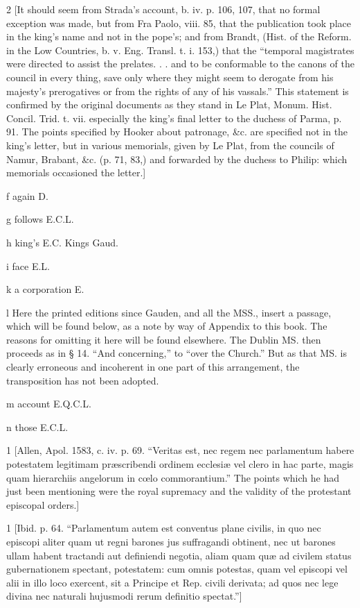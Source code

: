 2
[It should seem from Strada’s account, b. iv. p. 106, 107, that no formal exception was made, but from Fra Paolo, viii. 85, that the publication took place in the king’s name and not in the pope’s; and from Brandt, (Hist. of the Reform. in the Low Countries, b. v. Eng. Transl. t. i. 153,) that the “temporal magistrates were directed to assist the prelates. . . and to be conformable to the canons of the council in every thing, save only where they might seem to derogate from his majesty’s prerogatives or from the rights of any of his vassals.” This statement is confirmed by the original documents as they stand in Le Plat, Monum. Hist. Concil. Trid. t. vii. especially the king’s final letter to the duchess of Parma, p. 91. The points specified by Hooker about patronage, &c. are specified not in the king’s letter, but in various memorials, given by Le Plat, from the councils of Namur, Brabant, &c. (p. 71, 83,) and forwarded by the duchess to Philip: which memorials occasioned the letter.]

f
again D.

g
follows E.C.L.

h
king’s E.C. Kings Gaud.

i
face E.L.

k
a corporation E.

l
Here the printed editions since Gauden, and all the MSS., insert a passage, which will be found below, as a note by way of Appendix to this book. The reasons for omitting it here will be found elsewhere. The Dublin MS. then proceeds as in § 14. “And concerning,” to “over the Church.” But as that MS. is clearly erroneous and incoherent in one part of this arrangement, the transposition has not been adopted.

m
account E.Q.C.L.

n
those E.C.L.

1
[Allen, Apol. 1583, c. iv. p. 69. “Veritas est, nec regem nec parlamentum habere potestatem legitimam præscribendi ordinem ecclesiæ vel clero in hac parte, magis quam hierarchiis angelorum in cœlo commorantium.” The points which he had just been mentioning were the royal supremacy and the validity of the protestant episcopal orders.]

1
[Ibid. p. 64. “Parlamentum autem est conventus plane civilis, in quo nec episcopi aliter quam ut regni barones jus suffragandi obtinent, nec ut barones ullam habent tractandi aut definiendi negotia, aliam quam quæ ad civilem status gubernationem spectant, potestatem: cum omnis potestas, quam vel episcopi vel alii in illo loco exercent, sit a Principe et Rep. civili derivata; ad quos nec lege divina nec naturali hujusmodi rerum definitio spectat.”]

